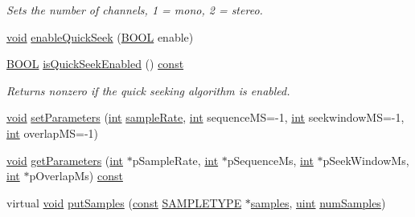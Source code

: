 \begin{DoxyCompactItemize}
\begin{DoxyCompactList}\small\item\em Sets the number of channels, 1 = mono, 2 = stereo. \end{DoxyCompactList}\item 
\hyperlink{sound_8c_ae35f5844602719cf66324f4de2a658b3}{void} \hyperlink{classsoundtouch_1_1_t_d_stretch_a4d781d62d334ac58a519043a8a30d321}{enable\+Quick\+Seek} (\hyperlink{nfilterkit_8h_a3be13892ae7076009afcf121347dd319}{B\+O\+OL} enable)
\item 
\hyperlink{nfilterkit_8h_a3be13892ae7076009afcf121347dd319}{B\+O\+OL} \hyperlink{classsoundtouch_1_1_t_d_stretch_abc6886a9671fb76f91fcd681ed442208}{is\+Quick\+Seek\+Enabled} () \hyperlink{getopt1_8c_a2c212835823e3c54a8ab6d95c652660e}{const} 
\begin{DoxyCompactList}\small\item\em Returns nonzero if the quick seeking algorithm is enabled. \end{DoxyCompactList}\item 
\hyperlink{sound_8c_ae35f5844602719cf66324f4de2a658b3}{void} \hyperlink{classsoundtouch_1_1_t_d_stretch_a50379535209e1a2951711a69436426f0}{set\+Parameters} (\hyperlink{xmltok_8h_a5a0d4a5641ce434f1d23533f2b2e6653}{int} \hyperlink{classsoundtouch_1_1_t_d_stretch_a475226e8ef3d04ebcbb83e13ff8e78e0}{sample\+Rate}, \hyperlink{xmltok_8h_a5a0d4a5641ce434f1d23533f2b2e6653}{int} sequence\+MS=-\/1, \hyperlink{xmltok_8h_a5a0d4a5641ce434f1d23533f2b2e6653}{int} seekwindow\+MS=-\/1, \hyperlink{xmltok_8h_a5a0d4a5641ce434f1d23533f2b2e6653}{int} overlap\+MS=-\/1)
\item 
\hyperlink{sound_8c_ae35f5844602719cf66324f4de2a658b3}{void} \hyperlink{classsoundtouch_1_1_t_d_stretch_a1a8b0a1cb993ffbdfd9e6827b23bec0a}{get\+Parameters} (\hyperlink{xmltok_8h_a5a0d4a5641ce434f1d23533f2b2e6653}{int} $\ast$p\+Sample\+Rate, \hyperlink{xmltok_8h_a5a0d4a5641ce434f1d23533f2b2e6653}{int} $\ast$p\+Sequence\+Ms, \hyperlink{xmltok_8h_a5a0d4a5641ce434f1d23533f2b2e6653}{int} $\ast$p\+Seek\+Window\+Ms, \hyperlink{xmltok_8h_a5a0d4a5641ce434f1d23533f2b2e6653}{int} $\ast$p\+Overlap\+Ms) \hyperlink{getopt1_8c_a2c212835823e3c54a8ab6d95c652660e}{const} 
\item 
virtual \hyperlink{sound_8c_ae35f5844602719cf66324f4de2a658b3}{void} \hyperlink{classsoundtouch_1_1_t_d_stretch_aa50296dfab0c762dab67ece6c2a142b9}{put\+Samples} (\hyperlink{getopt1_8c_a2c212835823e3c54a8ab6d95c652660e}{const} \hyperlink{namespacesoundtouch_a97cfd29a7abb4d4b2a72f803d5b5850c}{S\+A\+M\+P\+L\+E\+T\+Y\+PE} $\ast$\hyperlink{test__w__saw8_8c_a54185623a5a093f671a73e5fba6197a1}{samples}, \hyperlink{_s_t_types_8h_a91ad9478d81a7aaf2593e8d9c3d06a14}{uint} \hyperlink{classsoundtouch_1_1_f_i_f_o_processor_a254a8506a4a93083c0e914aff361c674}{num\+Samples})

\end{DoxyCompactItemize}
